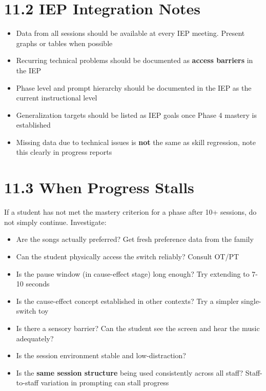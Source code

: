 \documentclass[justified,openright]{tufte-book}
\begin{document}
\section{11.2 IEP Integration Notes}\label{iep-integration-notes}

\begin{itemize}

\item
  Data from all sessions should be available at every IEP meeting.
  Present graphs or tables when possible
\item
  Recurring technical problems should be documented as \textbf{access
  barriers} in the IEP
\item
  Phase level and prompt hierarchy should be documented in the IEP as
  the current instructional level
\item
  Generalization targets should be listed as IEP goals once Phase 4
  mastery is established
\item
  Missing data due to technical issues is \textbf{not} the same as skill
  regression, note this clearly in progress reports
\end{itemize}

\section{11.3 When Progress Stalls}\label{when-progress-stalls}

If a student has not met the mastery criterion for a phase after 10+
sessions, do not simply continue. Investigate:

\begin{itemize}

\item
  Are the songs actually preferred? Get fresh preference data from the
  family
\item
  Can the student physically access the switch reliably? Consult OT/PT
\item
  Is the pause window (in cause-effect stage) long enough? Try extending
  to 7-10 seconds
\item
  Is the cause-effect concept established in other contexts? Try a
  simpler single-switch toy
\item
  Is there a sensory barrier? Can the student see the screen and hear
  the music adequately?
\item
  Is the session environment stable and low-distraction?
\item
  Is the \textbf{same session structure} being used consistently across
  all staff? Staff-to-staff variation in prompting can stall progress
\end{itemize}
\end{document}
